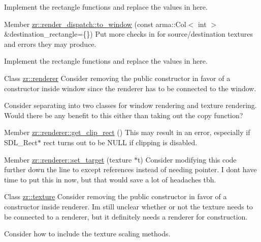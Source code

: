\begin{DoxyRefList}
Implement the rectangle functions and replace the values in here. 
\item[Member \mbox{\hyperlink{classzr_1_1render__dispatch_a81834edc2b1da8144c246492a6b8582f}{zr\+::render\+\_\+dispatch\+::to\+\_\+window}} (const arma\+::\+Col$<$ int $>$ \&destination\+\_\+rectangle=\{\})]\label{todo__todo000008}%
%
Put more checks in for source/destination textures and errors they may produce. 



Implement the rectangle functions and replace the values in here. 
\item[Class \mbox{\hyperlink{classzr_1_1renderer}{zr\+::renderer}} ]\label{todo__todo000009}%
%
Consider removing the public constructor in favor of a constructor inside \textquotesingle{}window\textquotesingle{} since the renderer has to be connected to the window. 



Consider separating into two classes for window rendering and texture rendering. Would there be any benefit to this either than taking out the {\ttfamily copy} function?  
\item[Member \mbox{\hyperlink{classzr_1_1renderer_a1997524c5ecf4022c3cfadae2ec07c14}{zr\+::renderer\+::get\+\_\+clip\+\_\+rect}} ()]\label{todo__todo000010}%
%
This may result in an error, especially if SDL\+\_\+\+Rect$\ast$ rect turns out to be NULL if clipping is disabled.  
\item[Member \mbox{\hyperlink{classzr_1_1renderer_a002e6b5ced794cbf8a6f8b0e9a9da8bd}{zr\+::renderer\+::set\+\_\+target}} (texture $\ast$t)]\label{todo__todo000011}%
%
Consider modifying this code further down the line to except references instead of needing pointer. I don\textquotesingle{}t have time to put this in now, but that would save a lot of headaches tbh. 
\item[Class \mbox{\hyperlink{classzr_1_1texture}{zr\+::texture}} ]\label{todo__todo000012}%
%
Consider removing the public constructor in favor of a constructor inside \textquotesingle{}renderer\textquotesingle{}. I\textquotesingle{}m still unclear whether or not the texture needs to be connected to a renderer, but it definitely needs a renderer for construction. 



Consider how to include the texture scaling methods. 




\end{DoxyRefList}
